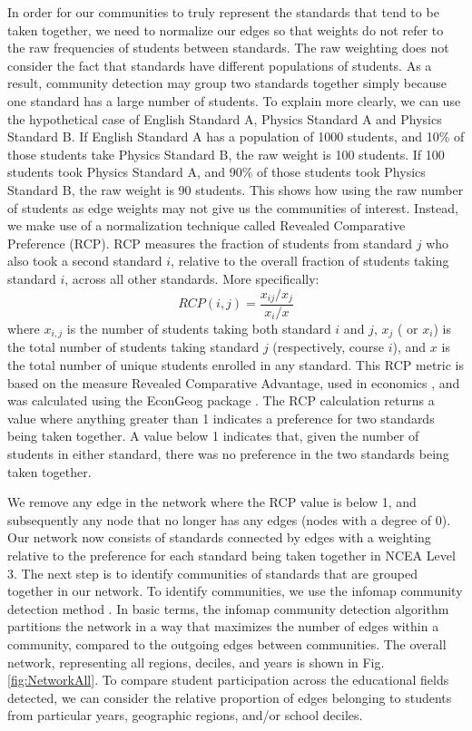\documentclass[a4paper]{article}
\begin{document}
In order for our communities to truly represent the standards that tend to be taken together, we need to normalize our edges so that weights do not refer to the raw frequencies of students between standards. The raw weighting does not consider the fact that standards have different populations of students. As a result, community detection may group two standards together simply because one standard has a large number of students. To explain more clearly, we can use the hypothetical case of English Standard A, Physics Standard A and Physics Standard B. If English Standard A has a population of 1000 students, and 10\% of those students take Physics Standard B, the raw weight is 100 students. If 100 students took Physics Standard A, and 90\% of those students took Physics Standard B, the raw weight is 90 students. This shows how using the raw number of students as edge weights may not give us the communities of interest. Instead, we make use of a normalization technique called Revealed Comparative Preference (RCP). RCP measures the fraction of students from standard $j$ who also took a second standard $i$, relative to the overall fraction of students taking standard $i$, across all other standards. More specifically: 
$$RCP(i,j) = \frac{x_{ij}/x_j}{x_i/x}$$
where $x_{i,j}$ is the number of students taking both standard $i$ and $j$, $x_j$ ( or $x_i$) is the total number of students taking standard $j$ (respectively, course $i$), and $x$ is the total number of unique students enrolled in any standard. This RCP metric is based on the measure Revealed Comparative Advantage, used in economics \cite{Balassa1965}, and was calculated using the EconGeog package \cite{balland2017economic}. The RCP calculation returns a value where anything greater than 1 indicates a preference for two standards being taken together. A value below 1 indicates that, given the number of students in either standard, there was no preference in the two standards being taken together. 

We remove any edge in the network where the RCP value is below 1, and subsequently any node that no longer has any edges (nodes with a degree of 0). Our network now consists of standards connected by edges with a weighting relative to the preference for each standard being taken together in NCEA Level 3. The next step is to identify communities of standards that are grouped together in our network. To identify communities, we use the infomap community detection method \cite{rosvall2009map}. In basic terms, the infomap community detection algorithm partitions the network in a way that maximizes the number of edges within a community, compared to the outgoing edges between communities. The overall network, representing all regions, deciles, and years is shown in Fig. \ref{fig:NetworkAll}. To compare student participation across the educational fields detected, we can consider the relative proportion of edges belonging to students from particular years, geographic regions, and/or school deciles. 
\end{document}
